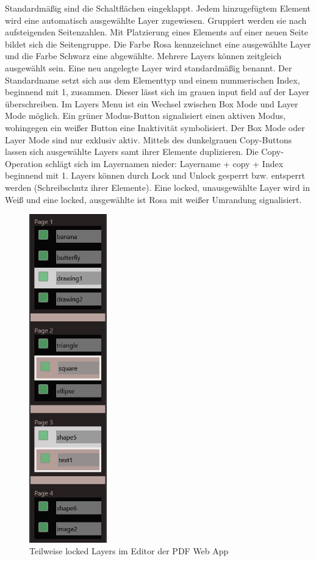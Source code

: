 Standardmäßig sind die Schaltflächen eingeklappt. Jedem hinzugefügtem Element wird eine automatisch ausgewählte Layer zugewiesen. Gruppiert werden sie nach aufsteigenden Seitenzahlen. Mit Platzierung eines Elements auf einer neuen Seite bildet sich die Seitengruppe. Die Farbe Rosa kennzeichnet eine ausgewählte Layer und die Farbe Schwarz eine abgewählte. Mehrere Layers können zeitgleich ausgewählt sein. Eine neu angelegte Layer wird standardmäßig benannt. Der Standardname setzt sich aus dem Elementtyp und einem nummerischen Index, beginnend mit 1, zusammen. Dieser lässt sich im grauen input field auf der Layer überschreiben. Im Layers Menu ist ein Wechsel zwischen Box Mode und Layer Mode möglich. Ein grüner Modus-Button signalisiert einen aktiven Modus, wohingegen ein weißer Button eine Inaktivität symbolisiert. Der Box Mode oder Layer Mode sind nur exklusiv aktiv. Mittels des dunkelgrauen Copy-Buttons lassen sich ausgewählte Layers samt ihrer Elemente duplizieren. Die Copy-Operation schlägt sich im Layernamen nieder: Layername + copy + Index beginnend mit 1. Layers können durch Lock und Unlock gesperrt bzw. entsperrt werden (Schreibschutz ihrer Elemente). Eine locked, unausgewählte Layer wird in Weiß und eine locked, ausgewählte ist Rosa mit weißer Umrandung signalisiert. 

\begin{figure}[!htbp]
	\centering
	\includegraphics[width=0.3\textwidth]{"images/ebenen.png"}
	\caption{Teilweise locked Layers im Editor der PDF Web App}
	\label{fig:ebenen}
\end{figure}

